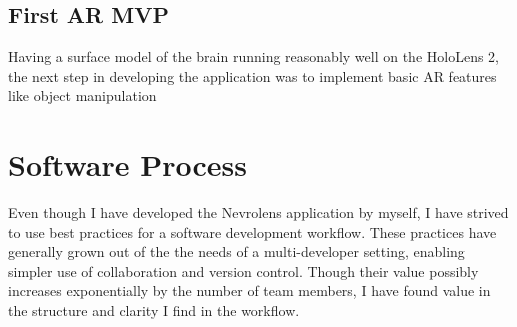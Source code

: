 \subsection*{First AR MVP}
Having a surface model of the brain running reasonably well on the HoloLens 2, the next step in developing the application was to implement basic AR features like object manipulation




\section{Software Process}


Even though I have developed the Nevrolens application by myself, I have strived to use best practices for a software development workflow. These practices have generally grown out of the the needs of a multi-developer setting, enabling simpler use of collaboration and version control. Though their value possibly increases exponentially by the number of team members, I have found value in the structure and clarity I find in the workflow. 

